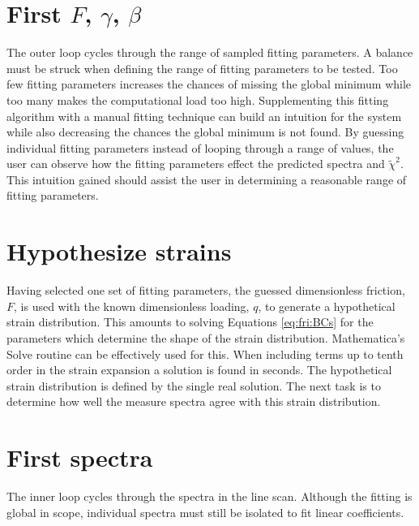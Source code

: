 \section*{First $F$, $\gamma$, $\beta$}
The outer loop cycles through the range of sampled fitting parameters.
A balance must be struck when defining the range of fitting parameters to be tested.
Too few fitting parameters increases the chances of missing the global minimum while too many makes the computational load too high.
Supplementing this fitting algorithm with a manual fitting technique can build an intuition for the system while also decreasing the chances the global minimum is not found.
By guessing individual fitting parameters instead of looping through a range of values, the user can observe how the fitting parameters effect the predicted spectra and $\tilde{\chi}^2$.
This intuition gained should assist the user in determining a reasonable range of fitting parameters.

\section*{Hypothesize strains}
Having selected one set of fitting parameters, the guessed dimensionless friction, $F$, is used with the known dimensionless loading, $q$, to generate a hypothetical strain distribution.
This amounts to solving Equations \ref{eq:fri:BCs} for the parameters which determine the shape of the strain distribution.
Mathematica's Solve routine can be effectively used for this.
When including terms up to tenth order in the strain expansion a solution is found in seconds.
The hypothetical strain distribution is defined by the single real solution.
The next task is to determine how well the measure spectra agree with this strain distribution.

\section*{First spectra}
The inner loop cycles through the spectra in the line scan.
Although the fitting is global in scope, individual spectra must still be isolated to fit linear coefficients.

